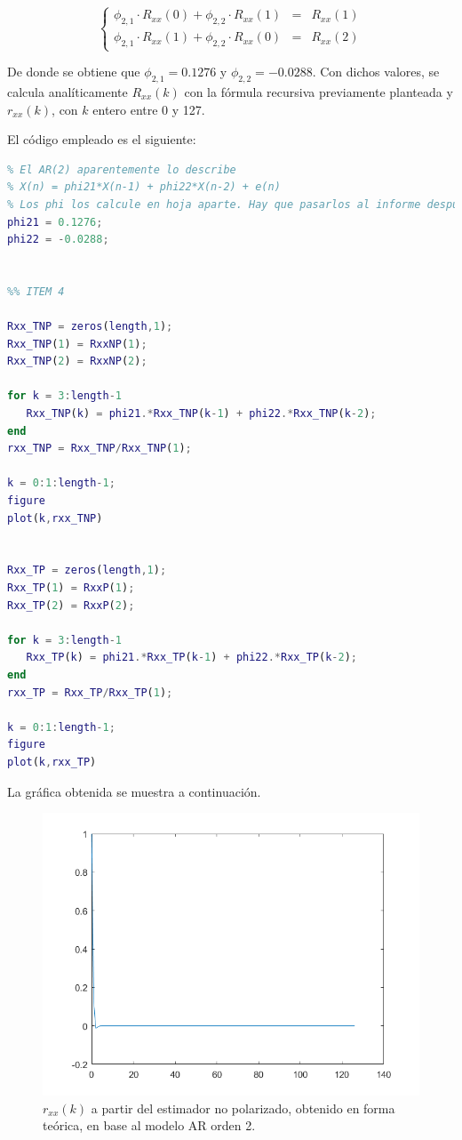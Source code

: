 \[
\left\{
\begin{array}{lll}
     \phi_{2,1} \cdot R_{xx}(0) + \phi_{2,2} \cdot R_{xx}(1) & = & R_{xx}(1) 
  \\ \phi_{2,1} \cdot R_{xx}(1) + \phi_{2,2} \cdot R_{xx}(0) & = & R_{xx}(2)
\end{array}
\right.
\]

De donde se obtiene que $\phi_{2,1} = 0.1276$ y $\phi_{2,2} = -0.0288$. Con dichos valores, se calcula anal\'iticamente $R_{xx}(k)$ con la fórmula recursiva previamente planteada y $ r_{xx}(k) $, con $k$ entero entre 0 y 127. 

El código empleado es el siguiente:

\begin{lstlisting}[language=Matlab, caption=EJ1.m]
%% ITEM 3
% El AR(2) aparentemente lo describe
% X(n) = phi21*X(n-1) + phi22*X(n-2) + e(n)
% Los phi los calcule en hoja aparte. Hay que pasarlos al informe despues
phi21 = 0.1276;
phi22 = -0.0288;


%% ITEM 4

Rxx_TNP = zeros(length,1);
Rxx_TNP(1) = RxxNP(1);
Rxx_TNP(2) = RxxNP(2);

for k = 3:length-1
   Rxx_TNP(k) = phi21.*Rxx_TNP(k-1) + phi22.*Rxx_TNP(k-2); 
end
rxx_TNP = Rxx_TNP/Rxx_TNP(1);

k = 0:1:length-1;
figure
plot(k,rxx_TNP)


Rxx_TP = zeros(length,1);
Rxx_TP(1) = RxxP(1);
Rxx_TP(2) = RxxP(2);

for k = 3:length-1
   Rxx_TP(k) = phi21.*Rxx_TP(k-1) + phi22.*Rxx_TP(k-2); 
end
rxx_TP = Rxx_TP/Rxx_TP(1);

k = 0:1:length-1;
figure
plot(k,rxx_TP)
\end{lstlisting}

La gráfica obtenida se muestra a continuación.

\begin{figure}[H] %
\centering
\includegraphics[scale=0.45]{../EJ1/rxxNPteorico}
\caption{$r_{xx}(k)$ a partir del estimador no polarizado, obtenido en forma teórica, en base al modelo AR orden 2.}
\label{rxxTeo}
\end{figure}

